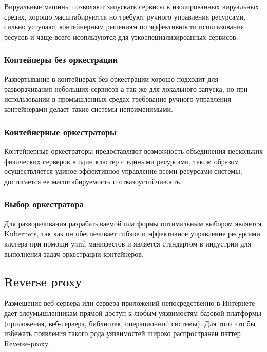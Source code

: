Вируальные машины позволяют запускать сервисы в изолированных вируальных средах, хорошо масштабируются но требуют ручного управления ресурсами, сильно уступают контейнерным решениям по эффективности использования ресусов и чаще всего исопльзуются для узкоспециализироанных сервисов\cite{jain2016overview}.

\subsubsection{Контейнеры без оркестрации}

Развертывание в контейнерах без оркестрации хорошо подходит для разворачивания небольших сервисов а так же для локального запуска, но при использовании в промышленных средах требование ручного управления контейнерами делает такие системы неприменимыми\cite{bentaleb2022containerization}.

\subsubsection{Контейнерные оркестраторы}

Контейнерные оркестраторы предоставляют возможность объединения нескольких физических серверов в один кластер с едиными ресурсами, таким образом осуществляется удиное эффективное управление всеми ресурсами системы, достигается ее масштабируемость и отказоустойчивость\cite{casalicchio2020state}. 

\subsubsection{Выбор оркестратора}

Для разворачивания разрабатываемой платформы оптимальным выбором является Kubernets, так как он обеспечивает гибкое и эффективное управление ресурсами клстера при помощи yaml манифестов и является стандартом в индустрии для выполнения задач оркестрации контейнеров\cite{pan2019performance}.

\subsection{Reverse proxy}

Размещение веб-сервера или сервера приложений непосредственно в Интернете дает злоумышленникам прямой доступ к любым уязвимостям базовой платформы (приложения, веб-сервера, библиотек, операционной системы). Для того что бы избежать появления такого рода уязвимостей широко распространен паттер Reverse-proxy\cite{sommerlad2003reverse}.

